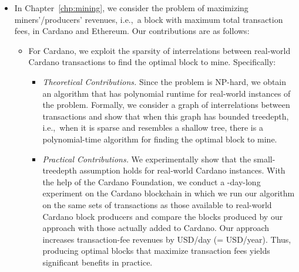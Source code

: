 \begin{itemize}
    \item In Chapter~\ref{chp:mining}, we consider the problem of maximizing miners'/producers' revenues, i.e.,~a block with maximum total transaction fees, in Cardano and Ethereum. Our contributions are as follows:
    \begin{itemize}
        \item For Cardano, we exploit the sparsity of interrelations between real-world Cardano transactions to find the optimal block to mine. Specifically:
        \begin{itemize}
            \item \emph{Theoretical Contributions.} Since the problem is NP-hard, we obtain an algorithm that has polynomial runtime for real-world instances of the problem. Formally, we consider a graph of interrelations between transactions and show that when this graph has bounded treedepth, i.e.,~when it is sparse and resembles a shallow tree, there is a polynomial-time algorithm for finding the optimal block to mine.
            
            \item \emph{Practical Contributions.} We experimentally show that the small-treedepth assumption holds for real-world Cardano instances. With the help of the Cardano Foundation, we conduct a -day-long experiment on the Cardano blockchain in which we run our algorithm on the same sets of transactions as those available to real-world Cardano block producers and compare the blocks produced by our approach with those actually added to Cardano. Our approach increases transaction-fee revenues by  USD/day (=  USD/year). Thus, producing optimal blocks that maximize transaction fees yields significant benefits in practice.
        \end{itemize}


\end{itemize}
\end{itemize}
